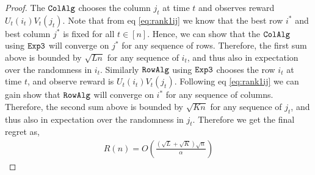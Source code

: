 \begin{proof}

The ${\tt ColAlg}$ chooses the column $j_t$ at time $t$ and observes reward $U_t(i_t) V_t(j_t)$. Note that from eq \eqref{eq:rank1ij} we know that the best row $i^*$ and best column $j^*$ is fixed for all $t\in [n]$. Hence, we can show that the ${\tt ColAlg}$ using ${\tt Exp3}$ will converge on $j^*$ for any sequence of rows. Therefore, the first sum above is bounded by $\sqrt{L n}$ for any sequence of $i_t$, and thus also in expectation over the randomness in $i_t$. Similarly ${\tt RowAlg}$ using ${\tt Exp3}$ chooses the row $i_t$ at time $t$, and observe reward is $U_t(i_t) V_t(j_t)$. Following eq \eqref{eq:rank1ij} we can gain show that ${\tt RowAlg}$ will converge on $i^*$ for any sequence of columns. Therefore, the second sum above is bounded by $\sqrt{K n}$ for any sequence of $j_t$, and thus also in expectation over the randomness in $j_t$. Therefore we get the final regret as,
\begin{align*}
  R(n) = O\left(\frac{\left(\sqrt{L } + \sqrt{K }\right)\sqrt{n}}{\alpha}\right)
\end{align*}
\end{proof}






